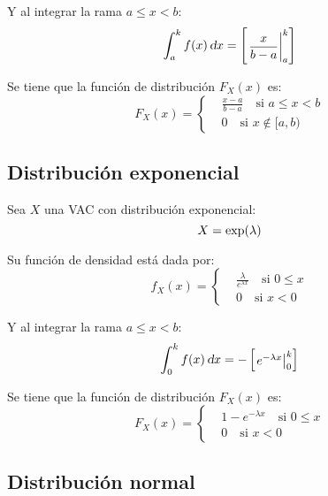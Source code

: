 Y al integrar la rama $a \leq x < b$:
\begin{equation*}
    \int_a^k f(x) \, \textsl{d} x = \begin{bmatrix} \left. \dfrac{x}{b-a} \right|_{a}^{k} \end{bmatrix}
\end{equation*}

Se tiene que la función de distribución $F_X(x)$ es:
\begin{equation*}
    F_X(x) =
    \left\{
    \begin{aligned}
        & \frac{x-a}{b-a} \quad \text{si } a \leq x < b
        \\
        & 0 \quad \text{si } x \notin [a,b)
    \end{aligned}
    \right.
\end{equation*}


\subsection{Distribución exponencial}

Sea $X$ una VAC con distribución exponencial:
\begin{equation*}
    X = \operatorname{exp}(\lambda)
\end{equation*}

Su función de densidad está dada por:
\begin{equation*}
    f_X(x) =
    \left\{
    \begin{aligned}
        & \frac{\lambda}{e^{\lambda x}} \quad \text{si } 0 \leq x
        \\[1ex]
        & 0 \quad \text{si } x < 0
    \end{aligned}
    \right.
\end{equation*}

Y al integrar la rama $a \leq x < b$:
\begin{equation*}
    \int_0^k f(x) \, \textsl{d} x = -\begin{bmatrix} \left. e^{-\lambda x} \right|_{0}^{k} \end{bmatrix}
\end{equation*}

Se tiene que la función de distribución $F_X(x)$ es:
\begin{equation*}
    F_X(x) =
    \left\{
    \begin{aligned}
        & 1-e^{-\lambda x} \quad \text{si } 0 \leq x
        \\
        & 0 \quad \text{si } x < 0
    \end{aligned}
    \right.
\end{equation*}


\subsection{Distribución normal}

